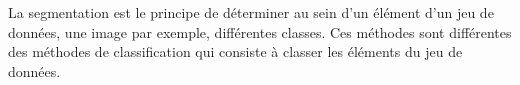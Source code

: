 \documentclass{book}
\newcommand{\p}{\vspace{0.2cm}}
\begin{document}
		La segmentation est le principe de déterminer au sein d'un élément d'un jeu de données, une image par exemple, différentes classes. Ces méthodes sont différentes des méthodes de classification qui consiste à classer les éléments du jeu de données.\p

	\backmatter


	\clearpage
	\printindex


	\nocite{*}
	
	
\end{document}
